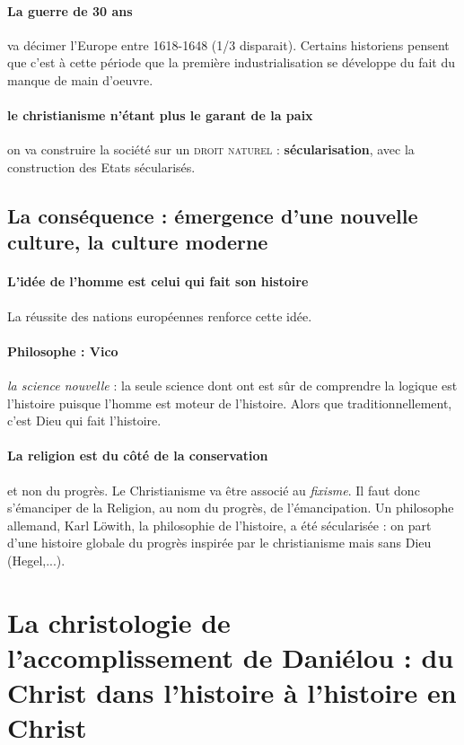 \paragraph{La guerre de 30 ans} va décimer l'Europe entre 1618-1648 (1/3 disparait). Certains historiens pensent que c'est à cette période que la première industrialisation se développe du fait du manque de main d'oeuvre.

\paragraph{le christianisme n'étant plus le garant de la paix} on va construire la société sur un \textsc{droit naturel} : \textbf{sécularisation}, avec la construction des Etats sécularisés.


\subsection{La conséquence : émergence d’une nouvelle culture, la culture moderne} 

\paragraph{L'idée de l'homme est celui qui fait son histoire} La réussite des nations européennes renforce cette idée.

\paragraph{Philosophe : Vico} \textit{la science nouvelle} : la seule science dont ont est sûr de comprendre la logique est l'histoire puisque l'homme est moteur de l'histoire. Alors que traditionnellement, c'est Dieu qui fait l'histoire. 

\paragraph{La religion est du côté de la conservation} et non du progrès. Le Christianisme va être associé au \textit{fixisme}. Il faut donc s'émanciper de la Religion, au nom du progrès, de l'émancipation. Un philosophe allemand, Karl Löwith, la philosophie de l'histoire, a été sécularisée : on part d'une histoire globale du progrès inspirée par le christianisme mais sans Dieu (Hegel,...). 


\section{La christologie de l’accomplissement de Daniélou : du Christ dans l’histoire à l’histoire en Christ }


